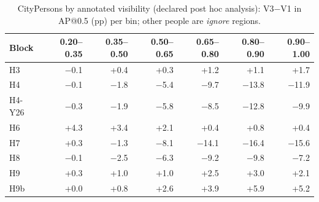 \begin{table}[H]\centering\scriptsize
\caption{CityPersons by annotated visibility (declared post hoc analysis): V3$-$V1 in AP@0.5 (pp) per bin; other people are \emph{ignore} regions.}\label{tab:s-vis}
\setlength{\tabcolsep}{2.5pt}\begin{tabular}{@{}l rrrrrr@{}}\toprule
Block & 0.20--0.35 & 0.35--0.50 & 0.50--0.65 & 0.65--0.80 & 0.80--0.90 & 0.90--1.00 \\ \midrule
H3 & $-$0.1 & +0.4 & +0.3 & +1.2 & +1.1 & +1.7 \\
H4 & $-$0.1 & $-$1.8 & $-$5.4 & $-$9.7 & $-$13.8 & $-$11.9 \\
H4-Y26 & $-$0.3 & $-$1.9 & $-$5.8 & $-$8.5 & $-$12.8 & $-$9.9 \\
H6 & +4.3 & +3.4 & +2.1 & +0.4 & +0.8 & +0.4 \\
H7 & +0.3 & $-$1.3 & $-$8.1 & $-$14.1 & $-$16.4 & $-$15.6 \\
H8 & $-$0.1 & $-$2.5 & $-$6.3 & $-$9.2 & $-$9.8 & $-$7.2 \\
H9 & +0.3 & +1.0 & +1.0 & +2.5 & +3.0 & +2.1 \\
H9b & +0.0 & +0.8 & +2.6 & +3.9 & +5.9 & +5.2 \\
\bottomrule\end{tabular}\end{table}

